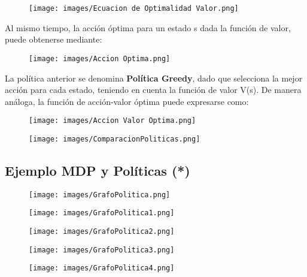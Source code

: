 \documentclass[11pt]{article}
\makeatletter
\def\maxwidth{\ifdim\Gin@nat@width>\linewidth\linewidth
    \else\Gin@nat@width\fi}
\let\Oldincludegraphics\includegraphics
\renewcommand{\includegraphics}[1]{\Oldincludegraphics[width=.8\maxwidth]{#1}}
\makeatother
\begin{document}
\begin{figure}
\centering
\texttt{[image: images/Ecuacion de Optimalidad Valor.png]}
\caption{}
\end{figure}

Al mismo tiempo, la acción óptima para un estado s dada la función de
valor, puede obtenerse mediante:

\begin{figure}
\centering
\texttt{[image: images/Accion Optima.png]}
\caption{}
\end{figure}

La política anterior se denomina \textbf{Política Greedy}, dado que
selecciona la mejor acción para cada estado, teniendo en cuenta la
función de valor V(s). De manera análoga, la función de acción-valor
óptima puede expresarse como:

\begin{figure}
\centering
\texttt{[image: images/Accion Valor Optima.png]}
\caption{}
\end{figure}

    \begin{figure}
\centering
\texttt{[image: images/ComparacionPoliticas.png]}
\caption{}
\end{figure}

    \subsection{Ejemplo MDP y Políticas
(*)}\label{ejemplo-mdp-y-poluxedticas}

\begin{figure}
\centering
\texttt{[image: images/GrafoPolitica.png]}
\caption{}
\end{figure}

    \begin{figure}
\centering
\texttt{[image: images/GrafoPolitica1.png]}
\caption{}
\end{figure}

    \begin{figure}
\centering
\texttt{[image: images/GrafoPolitica2.png]}
\caption{}
\end{figure}

    \begin{figure}
\centering
\texttt{[image: images/GrafoPolitica3.png]}
\caption{}
\end{figure}

    \begin{figure}
\centering
\texttt{[image: images/GrafoPolitica4.png]}
\caption{}
\end{figure}
\end{document}
